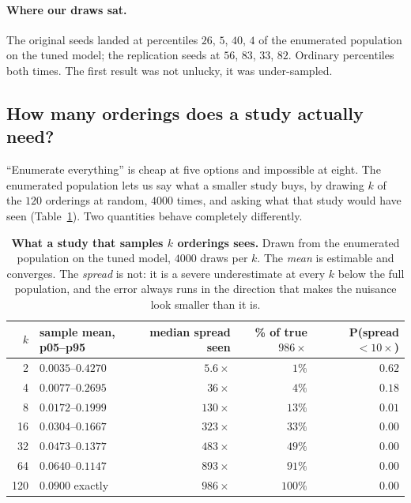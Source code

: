\documentclass{article}
\begin{document}
\paragraph{Where our draws sat.} The original seeds landed at percentiles $26$, $5$, $40$, $4$ of
the enumerated population on the tuned model; the replication seeds at $56$, $83$, $33$, $82$.
Ordinary percentiles both times. The first result was not unlucky, it was under-sampled.

\subsection{How many orderings does a study actually need?}
\label{sec:howmany}

``Enumerate everything'' is cheap at five options and impossible at eight. The enumerated population
lets us say what a smaller study buys, by drawing $k$ of the $120$ orderings at random, $4000$ times,
and asking what that study would have seen (Table~\ref{tab:k}). Two quantities behave completely
differently.

\begin{table}[t]
\centering
\small
\caption{\textbf{What a study that samples $k$ orderings sees.} Drawn from the enumerated population
on the tuned model, $4000$ draws per $k$. The \emph{mean} is estimable and converges. The
\emph{spread} is not: it is a severe underestimate at every $k$ below the full population, and the
error always runs in the direction that makes the nuisance look smaller than it is.}
\label{tab:k}
\begin{tabular}{@{}rlrrr@{}}
\toprule
$k$ & \textbf{sample mean, p05--p95} & \textbf{median spread seen} & \textbf{\% of true $986\times$} & \textbf{P(spread $<10\times$)} \\
\midrule
2    & $0.0035$--$0.4270$ & $5.6\times$  & $1\%$   & $0.62$ \\
4    & $0.0077$--$0.2695$ & $36\times$   & $4\%$   & $0.18$ \\
8    & $0.0172$--$0.1999$ & $130\times$  & $13\%$  & $0.01$ \\
16   & $0.0304$--$0.1667$ & $323\times$  & $33\%$  & $0.00$ \\
32   & $0.0473$--$0.1377$ & $483\times$  & $49\%$  & $0.00$ \\
64   & $0.0640$--$0.1147$ & $893\times$  & $91\%$  & $0.00$ \\
120  & $0.0900$ exactly   & $986\times$  & $100\%$ & $0.00$ \\
\bottomrule
\end{tabular}
\end{table}
\end{document}
